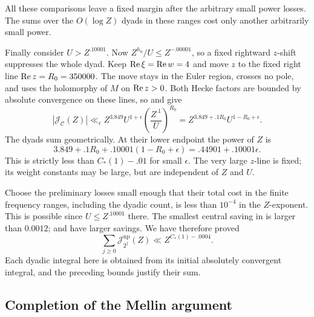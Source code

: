 All these comparisons leave a fixed margin after the arbitrary small
power losses.  The sums over the \(O(\log Z)\) dyads in these ranges
cost only another arbitrarily small power.

Finally consider \(U>Z^{.10001}\).  Now
\(Z^{h_0}/U\le Z^{-.00001}\), so a fixed rightward \(z\)-shift suppresses
the whole dyad.  Keep
\(\operatorname{Re}\xi=\operatorname{Re} w=4\) and move \(z\) to the fixed right line
\(\operatorname{Re} z=R_0=350000\).  The move stays in the Euler region, crosses no
pole, and uses the holomorphy of \(M\) on \(\operatorname{Re} z>0\).
Both Hecke factors are bounded by absolute convergence on these lines,
so  and  give
\[
 |\mathcal J_{\mathcal C}(Z)|
       \ll_\epsilon Z^{3.849}U^{1+\epsilon}
             \left(\frac{Z^{.1}}U\right)^{R_0}
       =Z^{3.849+.1R_0}U^{1-R_0+\epsilon}.
\]
The dyads sum geometrically.  At their lower endpoint the power of \(Z\)
is
\begin{equation}
 3.849+.1R_0+.10001(1-R_0+\epsilon)
       =.44901+.10001\epsilon .
\label{eq:far-frequency-exponent}
\end{equation}
This is strictly less than \(C_*(1)-.01\) for small \(\epsilon\).
The very large \(z\)-line is fixed; its weight constants may be large,
but are independent of \(Z\) and \(U\).

Choose the preliminary losses small enough that their total cost in the
finite frequency ranges, including the dyadic count, is less than
\(10^{-4}\) in the \(Z\)-exponent.  This is possible since
\(U\le Z^{.10001}\) there.  The smallest central saving in
 is larger than \(0.0012\);
 and  have
larger savings.  We have therefore proved
\begin{equation}
 \sum_{j\ge0}\mathcal J_{2^j}^{\mathrm{np}}(Z)
       \ll Z^{C_*(1)-.0004}.
\label{eq:nonprincipal-row-total}
\end{equation}
Each dyadic integral here is obtained from its initial absolutely
convergent integral, and the preceding bounds justify their sum.

\subsection{Completion of the Mellin argument}

